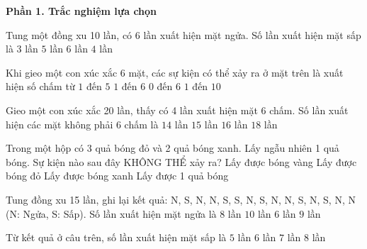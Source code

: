 \textbf{Phần 1. Trắc nghiệm lựa chọn}

\begin{ex} %
Tung một đồng xu 10 lần, có 6 lần xuất hiện mặt ngửa. Số lần xuất hiện mặt sấp là
\choice
{$3$ lần}
{$5$ lần}
{$6$ lần}
{\True $4$ lần}
\end{ex}

\begin{ex} %
Khi gieo một con xúc xắc 6 mặt, các sự kiện có thể xảy ra ở mặt trên là xuất hiện số chấm từ
\choice
{$1$ đến $5$}
{\True $1$ đến $6$}
{$0$ đến $6$}
{$1$ đến $10$}
\end{ex}

\begin{ex} %
Gieo một con xúc xắc 20 lần, thấy có 4 lần xuất hiện mặt 6 chấm. Số lần xuất hiện các mặt không phải 6 chấm là
\choice
{$14$ lần}
{$15$ lần}
{\True $16$ lần}
{$18$ lần}
\end{ex}

\begin{ex} %
Trong một hộp có 3 quả bóng đỏ và 2 quả bóng xanh. Lấy ngẫu nhiên 1 quả bóng. Sự kiện nào sau đây KHÔNG THỂ xảy ra?
\choice
{\True Lấy được bóng vàng}
{Lấy được bóng đỏ}
{Lấy được bóng xanh}
{Lấy được 1 quả bóng}
\end{ex}

\begin{ex} %
Tung đồng xu 15 lần, ghi lại kết quả: N, S, N, N, S, S, N, S, N, N, S, N, S, N, N (N: Ngửa, S: Sấp). Số lần xuất hiện mặt ngửa là
\choice
{$8$ lần}
{$10$ lần}
{$6$ lần}
{\True $9$ lần}
\end{ex}

\begin{ex} %
Từ kết quả ở câu trên, số lần xuất hiện mặt sấp là
\choice
{$5$ lần}
{\True $6$ lần}
{$7$ lần}
{$8$ lần}
\end{ex}


